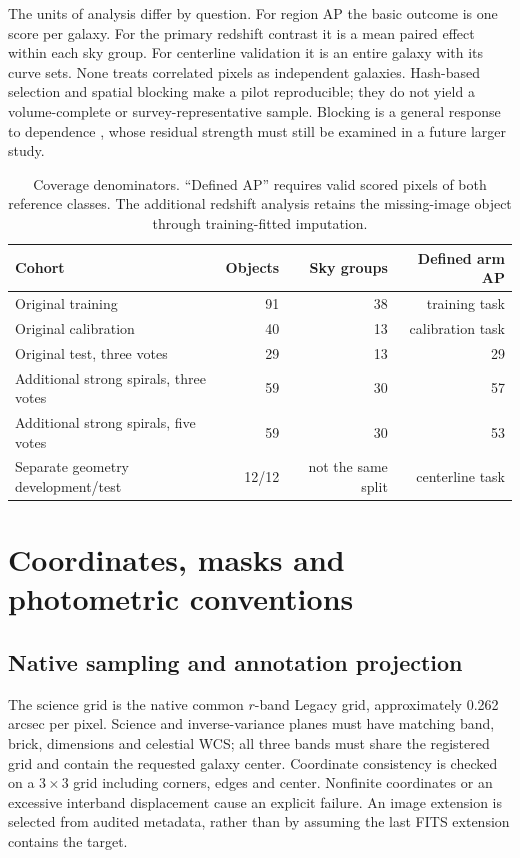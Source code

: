 \documentclass[10pt]{article}
\begin{document}
The units of analysis differ by question. For region AP the basic outcome is
one score per galaxy. For the primary redshift contrast it is a mean paired
effect within each sky group. For centerline validation it is an entire galaxy
with its curve sets. None treats correlated pixels as independent galaxies.
Hash-based selection and spatial blocking make a pilot reproducible; they do
not yield a volume-complete or survey-representative sample. Blocking is a
general response to dependence \citep{roberts2017}, whose residual strength
must still be examined in a future larger study.

\begin{table}[htb]
\centering
\caption{Coverage denominators. ``Defined AP'' requires valid scored pixels
of both reference classes. The additional redshift analysis retains the
missing-image object through training-fitted imputation.}
\begin{tabular}{lrrr}
\toprule
Cohort & Objects & Sky groups & Defined arm AP\\
\midrule
Original training & 91 & 38 & training task\\
Original calibration & 40 & 13 & calibration task\\
Original test, three votes & 29 & 13 & 29\\
Additional strong spirals, three votes & 59 & 30 & 57\\
Additional strong spirals, five votes & 59 & 30 & 53\\
Separate geometry development/test & 12/12 & not the same split & centerline task\\
\bottomrule
\end{tabular}
\end{table}

\section{Coordinates, masks and photometric conventions}
\subsection{Native sampling and annotation projection}
The science grid is the native common $r$-band Legacy grid, approximately
0.262 arcsec per pixel. Science and inverse-variance planes must have matching
band, brick, dimensions and celestial WCS; all three bands must share the
registered grid and contain the requested galaxy center. Coordinate consistency
is checked on a $3\times3$ grid including corners, edges and center. Nonfinite
coordinates or an excessive interband displacement cause an explicit failure.
An image extension is selected from audited metadata, rather than by assuming
the last FITS extension contains the target.
\end{document}
